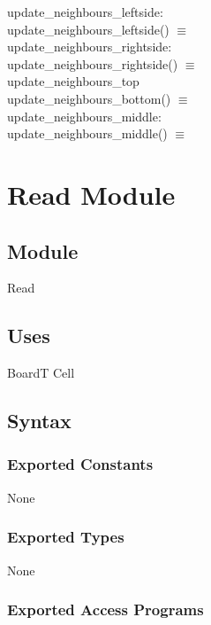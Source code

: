 \documentclass[12pt]{article}
\begin{document}
\noindent
update\_neighbours\_leftside: \\
update\_neighbours\_leftside() $\equiv$ \\

\noindent
update\_neighbours\_rightside: \\
update\_neighbours\_rightside() $\equiv$ \\

\noindent
update\_neighbours\_top\\
update\_neighbours\_bottom() $\equiv$ \\ 

\noindent
update\_neighbours\_middle: \\
update\_neighbours\_middle() $\equiv$ \\





\newpage

\section* {Read Module}

\subsection*{Module}

Read

\subsection* {Uses}

BoardT
Cell

\subsection* {Syntax}

\subsubsection* {Exported Constants}

None

\subsubsection* {Exported Types}

None

\subsubsection* {Exported Access Programs}
\end{document}
